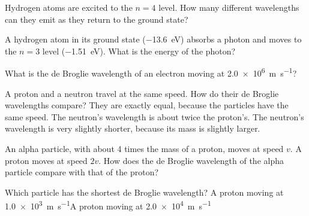 \begin{quizq}{}
Hydrogen atoms are excited to the $n = 4$ level. How many different wavelengths can they emit as they
return to the ground state?
\end{quizq}

\begin{quizq}{}
A hydrogen atom in its ground state (\qty{-13.6}{eV}) absorbs a photon and moves to the $n = 3$ level
(\qty{-1.51}{eV}). What is the energy of the photon?
\end{quizq}

\begin{quizq}{}
What is the de Broglie wavelength of an electron moving at \qty{2.0e6}{m.s^{-1}}?
\end{quizq}

\begin{quizq}{}
A proton and a neutron travel at the same speed. How do their de Broglie wavelengths compare?
  {They are exactly equal, because the particles have the same speed.}
  {The neutron's wavelength is about twice the proton's.}
  {The neutron's wavelength is very slightly shorter, because its mass is slightly larger.}
\end{quizq}

\begin{quizq}{}
An alpha particle, with about 4 times the mass of a proton, moves at speed $v$. A proton moves at speed
$2v$. How does the de Broglie wavelength of the alpha particle compare with that of the proton?
\end{quizq}

\begin{quizq}{}
Which particle has the shortest de Broglie wavelength?
  {A proton moving at \qty{1.0e3}{m.s^{-1}}}{A proton moving at \qty{2.0e4}{m.s^{-1}}}
\end{quizq}

